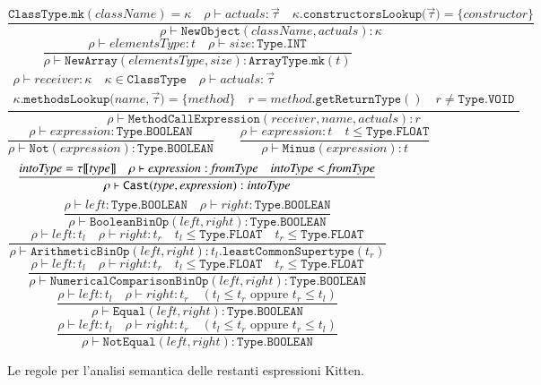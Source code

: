 \begin{figure}[t]
{\small
  \[
    \frac{\mathtt{ClassType.mk(\mathit{className})}=\kappa\quad
          \rho\vdash\mathit{actuals}:\vec{\tau}\quad
          \kappa\mathtt{.constructorsLookup(}\vec{\tau})=
          \{\mathit{constructor}\}}
         {\rho\vdash\mathtt{NewObject(\mathit{className},\mathit{actuals})}:
          \kappa}
  \]
  \[
    \frac{\rho\vdash\mathit{elementsType}:t\quad\rho\vdash\mathit{size}:
          \mathtt{Type.INT}}
         {\rho\vdash\mathtt{NewArray(\mathit{elementsType},\mathit{size})}:
          \mathtt{ArrayType.mk(\mathit{t})}}
  \]
  \[
     \frac{\begin{array}{c}
       \rho\vdash\mathit{receiver}:\kappa\quad\kappa\in\mathtt{ClassType}
         \quad\rho\vdash\mathit{actuals}:\vec{\tau}\\
       \kappa\mathtt{.methodsLookup(\mathit{name},}\vec{\tau})=
           \{\mathit{method}\}\quad
         r=\mathit{method}\mathtt{.getReturnType()}
           \quad r\not=\mathtt{Type.VOID}
       \end{array}}
          {\rho\vdash\mathtt{MethodCallExpression(\mathit{receiver},
           \mathit{name},\mathit{actuals})}:r}
  \]
  \[
    \frac{\rho\vdash\mathit{expression}:\mathtt{Type.BOOLEAN}}
         {\rho\vdash\mathtt{Not(\mathit{expression})}:\mathtt{Type.BOOLEAN}}
    \qquad
    \frac{\rho\vdash\mathit{expression}:t\quad t\le\mathtt{Type.FLOAT}}
         {\rho\vdash\mathtt{Minus(\mathit{expression})}:t}
  \]
  \[
    \frac{
          \mathit{intoType}={\tau[\![{\mathit{type}}]\!]}\quad
          \rho\vdash\mathit{expression}:\mathit{fromType}\quad
          \mathit{intoType} < \mathit{fromType}}
         {\rho\vdash\mathtt{Cast(\mathit{type},\mathit{expression})}:
          \mathit{intoType}}
  \]
  \[
    \frac{\rho\vdash\mathit{left}:\mathtt{Type.BOOLEAN}\quad
          \rho\vdash\mathit{right}:\mathtt{Type.BOOLEAN}}
         {\rho\vdash\mathtt{BooleanBinOp(\mathit{left},\mathit{right})}:
          \mathtt{Type.BOOLEAN}}
  \]
  \[
    \frac{\rho\vdash\mathit{left}:t_l\quad
          \rho\vdash\mathit{right}:t_r\quad t_l\le\mathtt{Type.FLOAT}
          \quad t_r\le\mathtt{Type.FLOAT}}
         {\rho\vdash\mathtt{ArithmeticBinOp(\mathit{left},\mathit{right})}:
          t_l\mathtt{.leastCommonSupertype(\mathit{t_r})}}
  \]
  \[
    \frac{\rho\vdash\mathit{left}:t_l\quad
          \rho\vdash\mathit{right}:t_r\quad t_l\le\mathtt{Type.FLOAT}
          \quad t_r\le\mathtt{Type.FLOAT}}
         {\rho\vdash\mathtt{NumericalComparisonBinOp
           (\mathit{left},\mathit{right})}:\mathtt{Type.BOOLEAN}}
  \]
  \[
    \frac{\rho\vdash\mathit{left}:t_l\quad
          \rho\vdash\mathit{right}:t_r\quad (t_l\le t_r\text{ oppure }
          t_r\le t_l)}
         {\rho\vdash\mathtt{Equal(\mathit{left},\mathit{right})}:
           \mathtt{Type.BOOLEAN}}
  \]
  \[
    \frac{\rho\vdash\mathit{left}:t_l\quad
          \rho\vdash\mathit{right}:t_r\quad (t_l\le t_r\text{ oppure }
          t_r\le t_l)}
         {\rho\vdash\mathtt{NotEqual(\mathit{left},\mathit{right})}:
           \mathtt{Type.BOOLEAN}}
  \]
}
\caption{Le regole per l'analisi semantica delle restanti espressioni Kitten.}
  \label{fig:analysis_expressions2}
\end{figure}
%
